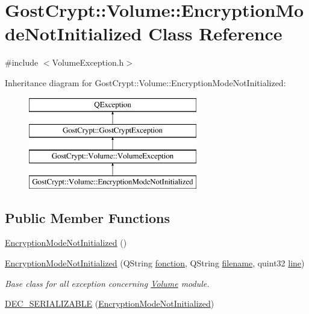 \hypertarget{class_gost_crypt_1_1_volume_1_1_encryption_mode_not_initialized}{}\section{Gost\+Crypt\+:\+:Volume\+:\+:Encryption\+Mode\+Not\+Initialized Class Reference}
\label{class_gost_crypt_1_1_volume_1_1_encryption_mode_not_initialized}


{\ttfamily \#include $<$Volume\+Exception.\+h$>$}

Inheritance diagram for Gost\+Crypt\+:\+:Volume\+:\+:Encryption\+Mode\+Not\+Initialized\+:\begin{figure}[H]
\begin{center}
\leavevmode
\includegraphics[height=4.000000cm]{class_gost_crypt_1_1_volume_1_1_encryption_mode_not_initialized}
\end{center}
\end{figure}
\subsection*{Public Member Functions}
\begin{DoxyCompactItemize}
\item 
\hyperlink{class_gost_crypt_1_1_volume_1_1_encryption_mode_not_initialized_ac5a103ea16f7094d07d5f54a7b4cbd11}{Encryption\+Mode\+Not\+Initialized} ()
\item 
\hyperlink{class_gost_crypt_1_1_volume_1_1_encryption_mode_not_initialized_a0ef8e2a0021bcfd59814cdfd4a194535}{Encryption\+Mode\+Not\+Initialized} (Q\+String \hyperlink{class_gost_crypt_1_1_gost_crypt_exception_a29b8c93d5efbb1ff369107385725a939}{fonction}, Q\+String \hyperlink{class_gost_crypt_1_1_gost_crypt_exception_a749a12375f4ba9d502623b99d8252f38}{filename}, quint32 \hyperlink{class_gost_crypt_1_1_gost_crypt_exception_abf506d911f12a4e969eea500f90bd32c}{line})
\begin{DoxyCompactList}\small\item\em Base class for all exception concerning \hyperlink{class_gost_crypt_1_1_volume_1_1_volume}{Volume} module. \end{DoxyCompactList}\item 
\hyperlink{class_gost_crypt_1_1_volume_1_1_encryption_mode_not_initialized_a174a26065000249789ff40d3722d2e00}{D\+E\+C\+\_\+\+S\+E\+R\+I\+A\+L\+I\+Z\+A\+B\+LE} (\hyperlink{class_gost_crypt_1_1_volume_1_1_encryption_mode_not_initialized}{Encryption\+Mode\+Not\+Initialized})
\end{DoxyCompactItemize}
